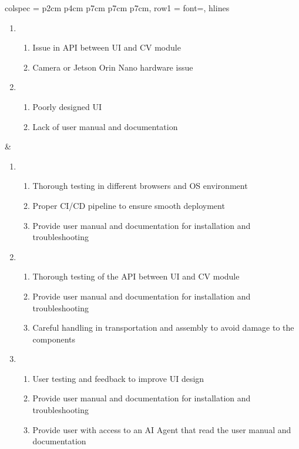 \documentclass{article}
\begin{document}
\begin{table}[htbp]
{\begin{tblr}{
    colspec = {p{2cm} p{4cm} p{7cm} p{7cm} p{7cm}},
    row{1} = {font=\bfseries},
    hlines
  }
\begin{enumerate}
\begin{enumerate}
            \item Issue in CD pipeline
            \item Browser compatibility issue
            \item OS environment issue
        \end{enumerate}
        \item \begin{enumerate}
                \item Issue in API between UI and CV module
                \item Camera or Jetson Orin Nano hardware issue
        \end{enumerate}
        \item \begin{enumerate}
                \item Poorly designed UI
                \item Lack of user manual and documentation
        \end{enumerate}
    \end{enumerate}
    &
    \begin{enumerate}
        \item \begin{enumerate}
            \item Thorough testing in different browsers and OS environment
            \item Proper CI/CD pipeline to ensure smooth deployment
            \item Provide user manual and documentation for installation and 
            troubleshooting
        \end{enumerate}
        \item \begin{enumerate}
                \item Thorough testing of the API between UI and CV module
                \item Provide user manual and documentation for installation and 
                troubleshooting
                \item Careful handling in transportation and assembly to avoid 
                damage to the components
            \end{enumerate}
        \item \begin{enumerate}
                \item User testing and feedback to improve UI design
                \item Provide user manual and documentation for installation and 
                troubleshooting
                \item Provide user with access to an AI Agent that read the user 
                manual and documentation
            \end{enumerate}
    \end{enumerate}
    
  \end{tblr}
  }
\end{table}
\end{document}
